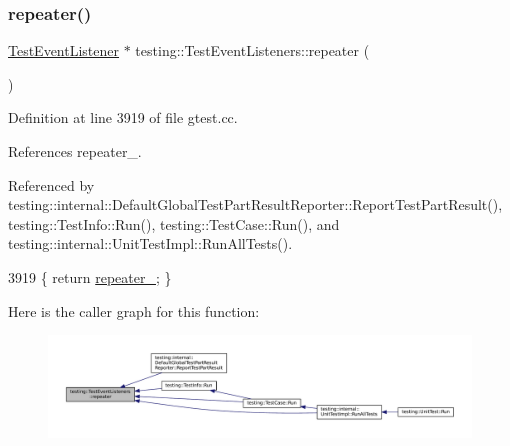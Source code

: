 \subsubsection{\texorpdfstring{repeater()}{repeater()}}
{\footnotesize\ttfamily \hyperlink{classtesting_1_1TestEventListener}{Test\+Event\+Listener} $\ast$ testing\+::\+Test\+Event\+Listeners\+::repeater (\begin{DoxyParamCaption}{ }\end{DoxyParamCaption})\hspace{0.3cm}{\ttfamily [private]}}



Definition at line 3919 of file gtest.\+cc.



References repeater\+\_\+.



Referenced by testing\+::internal\+::\+Default\+Global\+Test\+Part\+Result\+Reporter\+::\+Report\+Test\+Part\+Result(), testing\+::\+Test\+Info\+::\+Run(), testing\+::\+Test\+Case\+::\+Run(), and testing\+::internal\+::\+Unit\+Test\+Impl\+::\+Run\+All\+Tests().


\begin{DoxyCode}
3919 \{ \textcolor{keywordflow}{return} \hyperlink{classtesting_1_1TestEventListeners_a625d58b951893e80cde12862aece6fd8}{repeater\_}; \}
\end{DoxyCode}
Here is the caller graph for this function\+:
\nopagebreak
\begin{figure}[H]
\begin{center}
\leavevmode
\includegraphics[width=350pt]{classtesting_1_1TestEventListeners_ad28af964081553de465fbfc1c5a46650_icgraph}
\end{center}
\end{figure}
\mbox{\label{classtesting_1_1TestEventListeners_aeaab55da7c18c35fb12c27c18ff99955}} 
